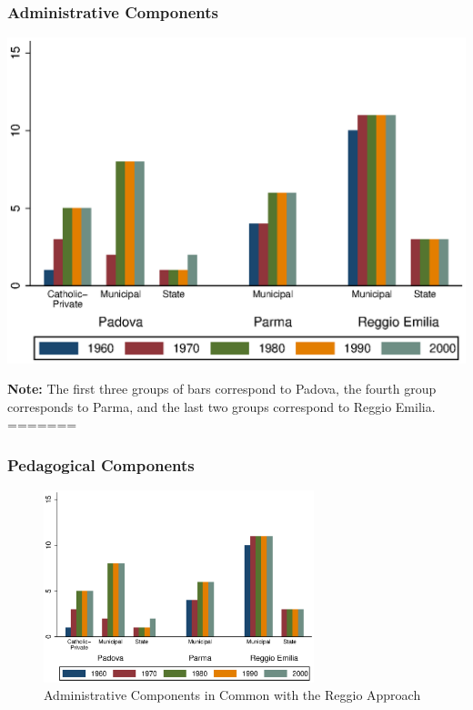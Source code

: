 \documentclass[static]{JJH-Beamer_PAGENOS}
\begin{document}

\begin{frame}
\frametitle{Administrative Components}
\begin{center}
\includegraphics[scale=0.7]{../../output/aggregatePedagogical.eps}
\end{center}
\tiny{\textbf{Note:} The first three groups of bars correspond to Padova, the fourth group corresponds to Parma, and the last two groups correspond to Reggio Emilia.}
=======
\frametitle{Pedagogical Components}
\centering
\begin{figure}[H]
\caption{Administrative Components in Common with the Reggio Approach}
\includegraphics[width=0.7\textwidth]{../../output/aggregatePedagogical.eps}
\end{figure}
\end{frame}


\end{document}
